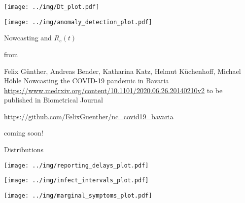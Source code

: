 \documentclass[
  8pt,
  ignorenonframetext,
]{beamer}
\begin{document}
\begin{frame}
\begin{center}
\texttt{[image: ../img/Dt\_plot.pdf]}
\end{center}
\end{frame}

\begin{frame}
\begin{center}
\texttt{[image: ../img/anomaly\_detection\_plot.pdf]}
\end{center}
\end{frame}

\begin{frame}
Nowcasting and \(R_e(t)\)

from

Felix Günther, Andreas Bender, Katharina Katz, Helmut Küchenhoff,
Michael Höhle \newline  Nowcasting the COVID-19 pandemic in Bavaria
\newline
\url{https://www.medrxiv.org/content/10.1101/2020.06.26.20140210v2}
\newline to be published in Biometrical Journal

\url{https://github.com/FelixGuenther/nc_covid19_bavaria}

\vspace{1cm}

\begin{center}
coming soon!
\end{center}
\end{frame}

\begin{frame}{Distributions}
\protect\hypertarget{distributions}{}
\begin{center}
\texttt{[image: ../img/reporting\_delays\_plot.pdf]}
\end{center}
\end{frame}

\begin{frame}
\begin{center}
\texttt{[image: ../img/infect\_intervals\_plot.pdf]}
\end{center}
\end{frame}

\begin{frame}
\begin{center}
\texttt{[image: ../img/marginal\_symptoms\_plot.pdf]}
\end{center}
\end{frame}
\end{document}
